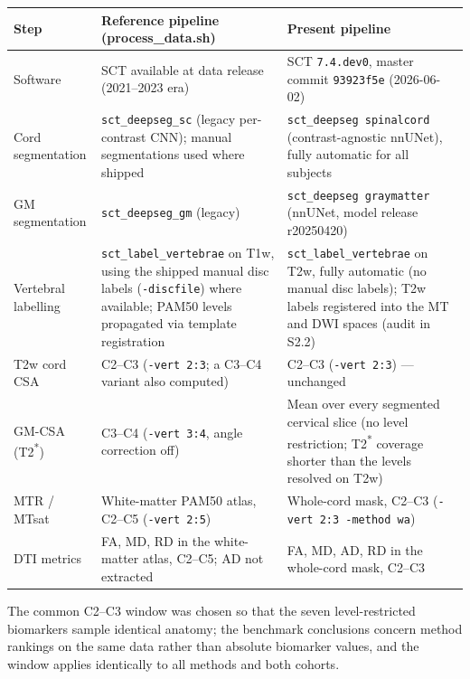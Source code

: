 \documentclass[12pt,a4paper]{article}
\begin{document}
\vspace{2mm}
\begin{table}[H]
\centering
\footnotesize
\setlength{\tabcolsep}{3pt}
\begin{tabular}{p{3.2cm}p{5.6cm}p{5.6cm}}
\toprule
\textbf{Step} & \textbf{Reference pipeline (process\_data.sh)} & \textbf{Present pipeline} \\
\midrule
Software & SCT available at data release (2021--2023 era) & SCT \texttt{7.4.dev0}, master commit \texttt{93923f5e} (2026-06-02) \\
Cord segmentation & \texttt{sct\_deepseg\_sc} (legacy per-contrast CNN); manual segmentations used where shipped & \texttt{sct\_deepseg spinalcord} (contrast-agnostic nnUNet), fully automatic for all subjects \\
GM segmentation & \texttt{sct\_deepseg\_gm} (legacy) & \texttt{sct\_deepseg graymatter} (nnUNet, model release r20250420) \\
Vertebral labelling & \texttt{sct\_label\_vertebrae} on T1w, using the shipped manual disc labels (\texttt{-discfile}) where available; PAM50 levels propagated via template registration & \texttt{sct\_label\_vertebrae} on T2w, fully automatic (no manual disc labels); T2w labels registered into the MT and DWI spaces (audit in S2.2) \\
T2w cord CSA & C2--C3 (\texttt{-vert 2:3}; a C3--C4 variant also computed) & C2--C3 (\texttt{-vert 2:3}) --- unchanged \\
GM-CSA (T2\textsuperscript{*}) & C3--C4 (\texttt{-vert 3:4}, angle correction off) & Mean over every segmented cervical slice (no level restriction; T2\textsuperscript{*} coverage shorter than the levels resolved on T2w) \\
MTR / MTsat & White-matter PAM50 atlas, C2--C5 (\texttt{-vert 2:5}) & Whole-cord mask, C2--C3 (\texttt{-vert 2:3 -method wa}) \\
DTI metrics & FA, MD, RD in the white-matter atlas, C2--C5; AD not extracted & FA, MD, AD, RD in the whole-cord mask, C2--C3 \\
\bottomrule
\end{tabular}
\end{table}

The common C2--C3 window was chosen so that the seven level-restricted biomarkers sample identical anatomy; the benchmark conclusions concern method rankings on the same data rather than absolute biomarker values, and the window applies identically to all methods and both cohorts.
\end{document}
